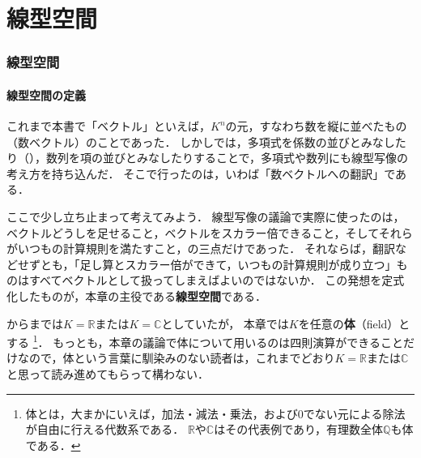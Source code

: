 \part{線型空間}

\begin{abstract}
  この章では\textbf{線型空間}を導入し，ベクトルを抽象的な立場から捉え直す．
  「ベクトルとは何か」ではなく「ベクトルに対して何ができるか」に着目することで，数ベクトルだけでなく，行列や多項式，関数，数列なども同じ枠組みで扱えるようになる．
  さらに，線型部分空間，基底，次元といった基本概念を導入し，線型空間の構造を調べる．
  最後に，基底を取り替えたときに座標がどのように変わるかを見る．
\end{abstract}

\section{線型空間}

\subsection{線型空間の定義}

これまで本書で「ベクトル」といえば，$K^n$の元，すなわち数を縦に並べたもの（数ベクトル）のことであった．
しかしでは，多項式を係数の並びとみなしたり（），数列を項の並びとみなしたりすることで，多項式や数列にも線型写像の考え方を持ち込んだ．
そこで行ったのは，いわば「数ベクトルへの翻訳」である．

ここで少し立ち止まって考えてみよう．
線型写像の議論で実際に使ったのは，ベクトルどうしを足せること，ベクトルをスカラー倍できること，そしてそれらがいつもの計算規則を満たすこと，の三点だけであった．
それならば，翻訳などせずとも，「足し算とスカラー倍ができて，いつもの計算規則が成り立つ」ものはすべてベクトルとして扱ってしまえばよいのではないか．
この発想を定式化したものが，本章の主役である\textbf{線型空間}である．

からまでは$K=\mathbb{R}$または$K=\mathbb{C}$としていたが，
本章では$K$を任意の\textbf{体}（field）とする%
\footnote{体とは，大まかにいえば，加法・減法・乗法，および$0$でない元による除法が自由に行える代数系である．
$\mathbb{R}$や$\mathbb{C}$はその代表例であり，有理数全体$\mathbb{Q}$も体である．}．
もっとも，本章の議論で体について用いるのは四則演算ができることだけなので，体という言葉に馴染みのない読者は，これまでどおり$K=\mathbb{R}$または$\mathbb{C}$と思って読み進めてもらって構わない．

